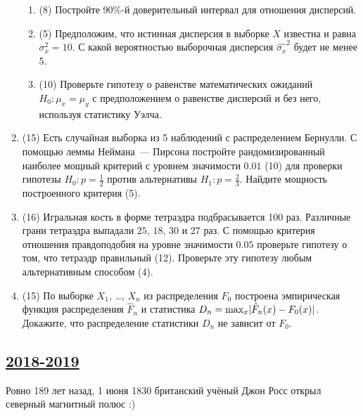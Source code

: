 \begin{enumerate}
\begin{enumerate}
    \item (8) Постройте 90\%-й доверительный интервал для отношения дисперсий.
    \item  (5) Предположим, что истинная дисперсия в выборке $X$ известна и равна $\sigma_x^2 = 10$. 
    С какой вероятностью выборочная дисперсия $\hat{\sigma_x}^2$ будет не менее 5. 
\item  (10) Проверьте гипотезу о равенстве математических ожиданий  $H_0: \mu_x = \mu_y$
с предположением о равенстве дисперсий и без него, используя статистику Уэлча.
\end{enumerate}

\item (15) Есть случайная выборка из 5 наблюдений с распределением Бернулли.
С помощью леммы Неймана~— Пирсона постройте рандомизированный наиболее мощный критерий с уровнем значимости $0.01$ (10) для проверки гипотезы $H_0: p=\frac{1}{2}$ против альтернативы $H_1: p=\frac{2}{3}$.
Найдите  мощность построенного критерия (5).

\item (16) Игральная кость в форме тетраэдра подбрасывается 100 раз. 
Различные грани тетраэдра выпадали $25$, $18$, $30$ и $27$ раз. 
С помощью критерия отношения правдоподобия на уровне значимости $0.05$ проверьте гипотезу о том, 
что тетраэдр правильный (12). 
Проверьте эту гипотезу любым альтернативным способом (4).


\item (15) По выборке $X_1$, \ldots, $X_n$ из распределения $F_0$ построена эмпирическая функция распределения $\hat F_n$ и статистика $D_n=\max_x \lvert\hat F_n(x)-F_0(x)\rvert$. 
Докажите, что распределение статистики $D_n$ не зависит от $F_0$.

\end{enumerate}


\subsection[2018-2019]{\hyperref[sec:sol_kr_04_ip_2018_2019]{2018-2019}}
\label{sec:kr_04_ip_2018_2019}

Ровно 189 лет назад, 1 июня 1830 британский учёный Джон Росс открыл северный магнитный полюс :)


